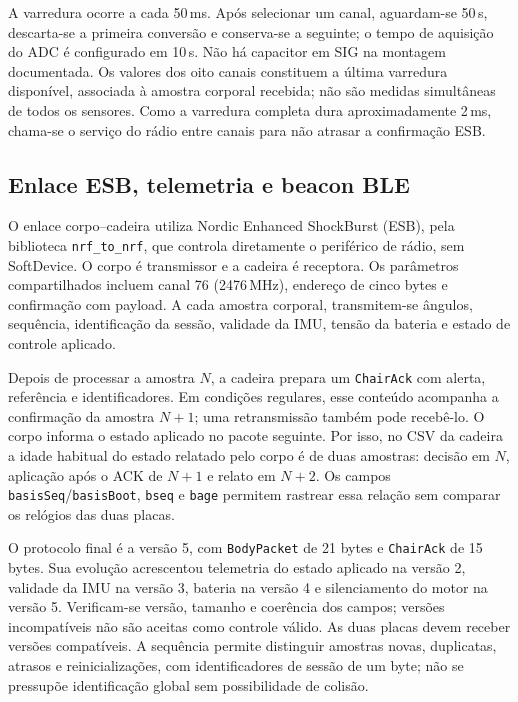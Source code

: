 A varredura ocorre a cada 50\,ms. Após selecionar um canal, aguardam-se
50\,\textmu s, descarta-se a primeira conversão e conserva-se a seguinte;
o tempo de aquisição do ADC é configurado em 10\,\textmu s. Não há
capacitor em SIG na montagem documentada. Os valores dos oito canais
constituem a última varredura disponível, associada à amostra corporal
recebida; não são medidas simultâneas de todos os sensores. Como a
varredura completa dura aproximadamente 2\,ms, chama-se o serviço do
rádio entre canais para não atrasar a confirmação ESB.

\subsection{Enlace ESB, telemetria e beacon BLE}
\label{sec:met-enlace}

O enlace corpo--cadeira utiliza Nordic Enhanced ShockBurst (ESB), pela
biblioteca \texttt{nrf\_to\_nrf}, que controla diretamente o periférico
de rádio, sem SoftDevice. O corpo é transmissor e a cadeira é receptora.
Os parâmetros compartilhados incluem canal 76 (2476\,MHz), endereço
de cinco bytes e confirmação com payload. A cada amostra corporal,
transmitem-se ângulos, sequência, identificação da sessão, validade da
IMU, tensão da bateria e estado de controle aplicado.

Depois de processar a amostra $N$, a cadeira prepara um
\texttt{ChairAck} com alerta, referência e identificadores. Em condições
regulares, esse conteúdo acompanha a confirmação da amostra $N+1$;
uma retransmissão também pode recebê-lo. O corpo informa o estado
aplicado no pacote seguinte. Por isso, no CSV da cadeira a idade
habitual do estado relatado pelo corpo é de duas amostras: decisão em
$N$, aplicação após o ACK de $N+1$ e relato em $N+2$. Os campos
\texttt{basisSeq}/\texttt{basisBoot}, \texttt{bseq} e \texttt{bage}
permitem rastrear essa relação sem comparar os relógios das duas placas.

O protocolo final é a versão 5, com \texttt{BodyPacket} de 21 bytes e
\texttt{ChairAck} de 15 bytes. Sua evolução acrescentou telemetria do
estado aplicado na versão 2, validade da IMU na versão 3, bateria na
versão 4 e silenciamento do motor na versão 5. Verificam-se versão,
tamanho e coerência dos campos; versões incompatíveis não são aceitas
como controle válido. As duas placas devem receber versões
compatíveis. A sequência permite distinguir amostras novas, duplicatas,
atrasos e reinicializações, com identificadores de sessão de um byte;
não se pressupõe identificação global sem possibilidade de colisão.


